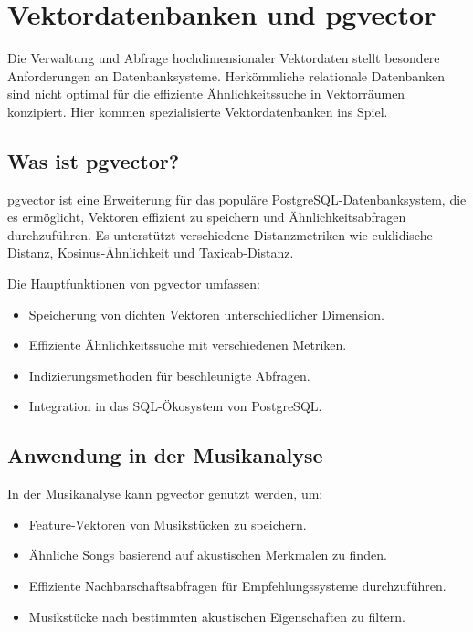 \section{Vektordatenbanken und pgvector}

Die Verwaltung und Abfrage hochdimensionaler Vektordaten stellt besondere Anforderungen an Datenbanksysteme. Herkömmliche relationale Datenbanken sind nicht optimal für die effiziente Ähnlichkeitssuche in Vektorräumen konzipiert. Hier kommen spezialisierte Vektordatenbanken ins Spiel.

\subsection{Was ist pgvector?}

pgvector ist eine Erweiterung für das populäre PostgreSQL-Datenbanksystem, die es ermöglicht, Vektoren effizient zu speichern und Ähnlichkeitsabfragen durchzuführen. Es unterstützt verschiedene Distanzmetriken wie euklidische Distanz, Kosinus-Ähnlichkeit und Taxicab-Distanz.

Die Hauptfunktionen von pgvector umfassen:

\begin{itemize}
    \item Speicherung von dichten Vektoren unterschiedlicher Dimension.
    \item Effiziente Ähnlichkeitssuche mit verschiedenen Metriken.
    \item Indizierungsmethoden für beschleunigte Abfragen.
    \item Integration in das SQL-Ökosystem von PostgreSQL.
\end{itemize}

\subsection{Anwendung in der Musikanalyse}

In der Musikanalyse kann pgvector genutzt werden, um:

\begin{itemize}
    \item Feature-Vektoren von Musikstücken zu speichern.
    \item Ähnliche Songs basierend auf akustischen Merkmalen zu finden.
    \item Effiziente Nachbarschaftsabfragen für Empfehlungssysteme durchzuführen.
    \item Musikstücke nach bestimmten akustischen Eigenschaften zu filtern.
\end{itemize}


